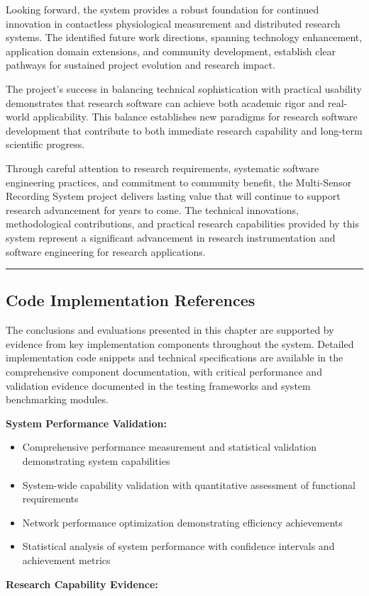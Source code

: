 \documentclass[12pt,a4paper]{article}
\begin{document}
Looking forward, the system provides a robust foundation for continued innovation in contactless physiological
measurement and distributed research systems. The identified future work directions, spanning technology enhancement,
application domain extensions, and community development, establish clear pathways for sustained project evolution and
research impact.

The project's success in balancing technical sophistication with practical usability demonstrates that research software
can achieve both academic rigor and real-world applicability. This balance establishes new paradigms for research
software development that contribute to both immediate research capability and long-term scientific progress.

Through careful attention to research requirements, systematic software engineering practices, and commitment to
community benefit, the Multi-Sensor Recording System project delivers lasting value that will continue to support
research advancement for years to come. The technical innovations, methodological contributions, and practical research
capabilities provided by this system represent a significant advancement in research instrumentation and software
engineering for research applications.

\hrule

\subsection{Code Implementation References}

The conclusions and evaluations presented in this chapter are supported by evidence from key implementation components
throughout the system. Detailed implementation code snippets and technical specifications are available in the
comprehensive component documentation, with critical performance and validation evidence documented in the testing
frameworks and system benchmarking modules.

\textbf{System Performance Validation:}

\begin{itemize}
\item Comprehensive performance measurement and statistical validation demonstrating system capabilities
\item System-wide capability validation with quantitative assessment of functional requirements
\item Network performance optimization demonstrating efficiency achievements
\item Statistical analysis of system performance with confidence intervals and achievement metrics

\end{itemize}
\textbf{Research Capability Evidence:}
\end{document}
